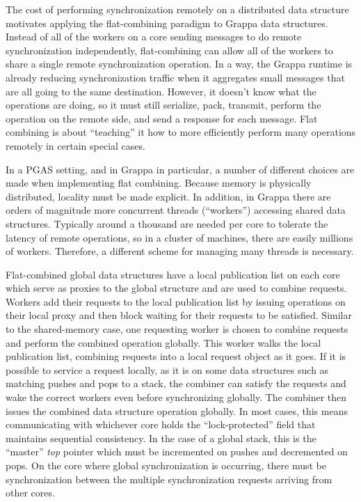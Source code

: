 The cost of performing synchronization remotely on a distributed data structure motivates applying the flat-combining paradigm to Grappa data structures. Instead of all of the workers on a core sending messages to do remote synchronization independently, flat-combining can allow all of the workers to share a single remote synchronization operation. In a way, the Grappa runtime is already reducing synchronization traffic when it aggregates small messages that are all going to the same destination. However, it doesn't know what the operations are doing, so it must still serialize, pack, transmit, perform the operation on the remote side, and send a response for each message. Flat combining is about ``teaching'' it how to more efficiently perform many operations remotely in certain special cases.

In a PGAS setting, and in Grappa in particular, a number of different choices are made when implementing flat combining. Because memory is physically distributed, locality must be made explicit. In addition, in Grappa there are orders of magnitude more concurrent threads (``workers'') accessing shared data structures. Typically around a thousand are needed per core to tolerate the latency of remote operations, so in a cluster of machines, there are easily millions of workers. Therefore, a different scheme for managing many threads is necessary.

Flat-combined global data structures have a local publication list on each core which serve as proxies to the global structure and are used to combine requests. Workers add their requests to the local publication list by issuing operations on their local proxy and then block waiting for their requests to be satisfied. Similar to the shared-memory case, one requesting worker is chosen to combine requests and perform the combined operation globally. This worker walks the local publication list, combining requests into a local request object as it goes. If it is possible to service a request locally, as it is on some data structures such as matching pushes and pops to a stack, the combiner can satisfy the requests and wake the correct workers even before synchronizing globally. The combiner then issues the combined data structure operation globally. In most cases, this means communicating with whichever core holds the ``lock-protected'' field that maintains sequential consistency. In the case of a global stack, this is the ``master'' \emph{top} pointer which must be incremented on pushes and decremented on pops. On the core where global synchronization is occurring, there must be synchronization between the multiple synchronization requests arriving from other cores.

